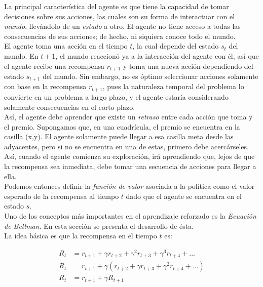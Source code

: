 La principal caracter\'istica del agente es que tiene la capacidad de tomar decisiones sobre sus acciones, las cuales son su forma de interactuar con el \textit{mundo}, llev\'andolo de un \textit{estado} a otro. El agente no tiene acceso a todas las consecuencias de sus acciones; de hecho, ni siquiera conoce todo el mundo.\\

El agente toma una acci\'on en el tiempo $t$, la cual depende del estado $s_t$ del mundo. En $t+1$, el mundo reaccion\'o ya a la interacci\'on del agente con \'el, as\'i que el agente recibe una recompensa $r_{t+1}$ y toma una nueva acci\'on dependiendo del estado $s_{t+1}$ del mundo. Sin embargo, no es \'optimo seleccionar acciones solamente con base en la recompensa $r_{t+1}$, pues la naturaleza temporal del problema lo convierte en un problema a largo plazo, y el agente estar\'ia considerando solamente consecuencias en el corto plazo.\\

As\'i, el agente debe aprender que existe un \textit{retraso} entre cada acci\'on que toma y el premio. Supongamos que, en una cuadr\'icula, el premio se encuentra en la casilla (x,y). El agente solamente puede llegar a esa casilla meta desde las adyacentes, pero si no se encuentra en una de estas, primero debe acerc\'arseles. As\'i, cuando el agente comienza su exploraci\'on, ir\'a aprendiendo que, lejos de que la recompensa sea inmediata, debe tomar una secuencia de acciones para llegar a ella.\\

Podemos entonces definir la \textit{funci\'on de valor} asociada a la pol\'itica como el valor esperado de la recompensa al tiempo $t$ dado que el agente se encuentra en el estado $s$.\\

Uno de los conceptos m\'as importantes en el aprendizaje reforzado es la \textit{Ecuaci\'on de Bellman}. En esta secci\'on se presenta el desarrollo de \'esta. \\

La idea b\'asica es que la recompensa en el tiempo $t$ es:

\vspace{-30pt}
\begin{align*}
R_{t} &= r_{t+1} + \gamma r_{t+2} + \gamma^{2} r_{t+3} + \gamma^{3} r_{t+4} + ... \\
R_{t} &= r_{t+1} + \gamma \left( r_{t+2} + \gamma r_{t+3} + \gamma^{2}r_{t+4} + ...  \right)  \\
R_{t} &= r_{t+1} + \gamma R_{t+1}
\end{align*}

